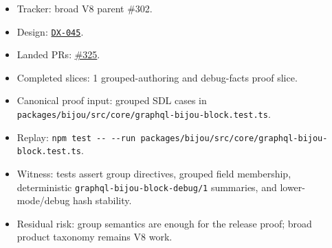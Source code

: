 \begin{itemize}
\tightlist
\item
  Tracker: broad V8 parent \#302.
\item
  Design: \href{https://github.com/flyingrobots/bijou/blob/cbd70612140e7a450d764b3c7be1c6af878b99bc/docs/design/DX-045-graphql-block-groups-and-debug-facts.md}{\texttt{D\allowbreak{}X\allowbreak{}-\allowbreak{}0\allowbreak{}4\allowbreak{}5}}.
\item
  Landed PRs: \href{https://github.com/flyingrobots/bijou/pull/325}{\#325}.
\item
  Completed slices: 1 grouped-authoring and debug-facts proof slice.
\item
  Canonical proof input: grouped SDL cases in \texttt{p\allowbreak{}a\allowbreak{}c\allowbreak{}k\allowbreak{}a\allowbreak{}g\allowbreak{}e\allowbreak{}s\allowbreak{}/\allowbreak{}b\allowbreak{}i\allowbreak{}j\allowbreak{}o\allowbreak{}u\allowbreak{}/\allowbreak{}s\allowbreak{}r\allowbreak{}c\allowbreak{}/\allowbreak{}c\allowbreak{}o\allowbreak{}r\allowbreak{}e\allowbreak{}/\allowbreak{}g\allowbreak{}r\allowbreak{}a\allowbreak{}p\allowbreak{}h\allowbreak{}q\allowbreak{}l\allowbreak{}-\allowbreak{}b\allowbreak{}i\allowbreak{}j\allowbreak{}o\allowbreak{}u\allowbreak{}-\allowbreak{}b\allowbreak{}l\allowbreak{}o\allowbreak{}c\allowbreak{}k\allowbreak{}.\allowbreak{}t\allowbreak{}e\allowbreak{}s\allowbreak{}t\allowbreak{}.\allowbreak{}t\allowbreak{}s}.
\item
  Replay: \texttt{n\allowbreak{}p\allowbreak{}m\allowbreak{} \allowbreak{}t\allowbreak{}e\allowbreak{}s\allowbreak{}t\allowbreak{} \allowbreak{}-\allowbreak{}-\allowbreak{} \allowbreak{}-\allowbreak{}-\allowbreak{}r\allowbreak{}u\allowbreak{}n\allowbreak{} \allowbreak{}p\allowbreak{}a\allowbreak{}c\allowbreak{}k\allowbreak{}a\allowbreak{}g\allowbreak{}e\allowbreak{}s\allowbreak{}/\allowbreak{}b\allowbreak{}i\allowbreak{}j\allowbreak{}o\allowbreak{}u\allowbreak{}/\allowbreak{}s\allowbreak{}r\allowbreak{}c\allowbreak{}/\allowbreak{}c\allowbreak{}o\allowbreak{}r\allowbreak{}e\allowbreak{}/\allowbreak{}g\allowbreak{}r\allowbreak{}a\allowbreak{}p\allowbreak{}h\allowbreak{}q\allowbreak{}l\allowbreak{}-\allowbreak{}b\allowbreak{}i\allowbreak{}j\allowbreak{}o\allowbreak{}u\allowbreak{}-\allowbreak{}b\allowbreak{}l\allowbreak{}o\allowbreak{}c\allowbreak{}k\allowbreak{}.\allowbreak{}t\allowbreak{}e\allowbreak{}s\allowbreak{}t\allowbreak{}.\allowbreak{}t\allowbreak{}s}.
\item
  Witness: tests assert group directives, grouped field membership, deterministic \texttt{g\allowbreak{}r\allowbreak{}a\allowbreak{}p\allowbreak{}h\allowbreak{}q\allowbreak{}l\allowbreak{}-\allowbreak{}b\allowbreak{}i\allowbreak{}j\allowbreak{}o\allowbreak{}u\allowbreak{}-\allowbreak{}b\allowbreak{}l\allowbreak{}o\allowbreak{}c\allowbreak{}k\allowbreak{}-\allowbreak{}d\allowbreak{}e\allowbreak{}b\allowbreak{}u\allowbreak{}g\allowbreak{}/\allowbreak{}1} summaries, and lower-mode/debug hash stability.
\item
  Residual risk: group semantics are enough for the release proof; broad product taxonomy remains V8 work.
\end{itemize}

